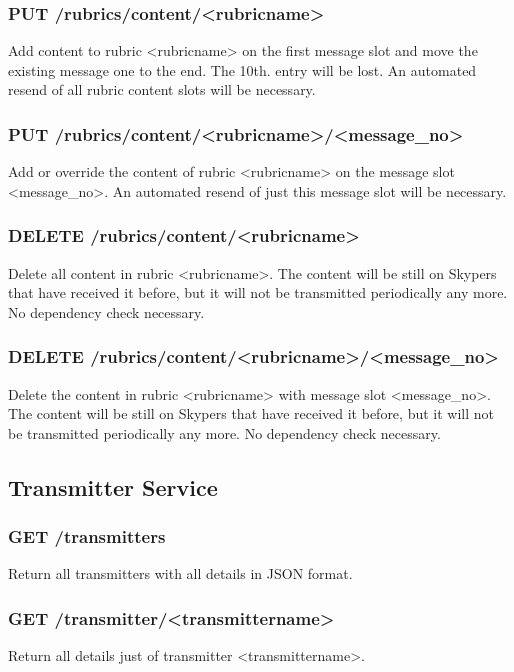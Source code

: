 \subsubsection{PUT /rubrics/content/<rubricname>}
Add content to rubric <rubricname> on the first message slot and move the existing message one to the end. The 10th. entry will be lost. An automated resend of all rubric content slots will be necessary.

\subsubsection{PUT /rubrics/content/<rubricname>/<message\_no>}
Add or override the content of rubric <rubricname> on the message slot <message\_no>. An automated resend of just this message slot will be necessary.

\subsubsection{DELETE /rubrics/content/<rubricname>}
Delete all content in rubric <rubricname>. The content will be still on Skypers that have received it before, but it will not be transmitted periodically any more. No dependency check necessary.

\subsubsection{DELETE /rubrics/content/<rubricname>/<message\_no>}
Delete the content in rubric <rubricname> with message slot <message\_no>. The content will be still on Skypers that have received it before, but it will not be transmitted periodically any more. No dependency check necessary.

\subsection{Transmitter Service}

\subsubsection{GET /transmitters}
Return all transmitters with all details in JSON format.

\subsubsection{GET /transmitter/<transmittername>}
Return all details just of transmitter <transmittername>.

